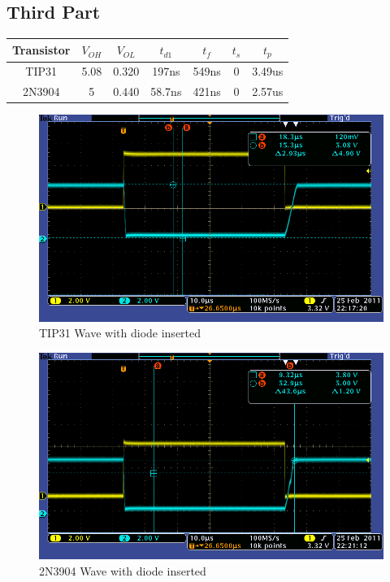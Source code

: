 \documentclass[10pt]{report}
\begin{document}
	\subsection{Third Part}
		\begin{center} \begin{tabular}{*{6}{c|}c}
			Transistor & $V_{OH}$ & $V_{OL}$ & $t_{d1}$ & $t_f$ & $t_s$ & $t_p$
			\\ \hline

			TIP31 & 5.08 & 0.320 & 197ns & 549ns & 0 & 3.49us \\

			2N3904 & 5 & 0.440 & 58.7ns & 421ns & 0 & 2.57us \\

		\end{tabular} \end{center}

		\begin{figure} \begin{center}
			\includegraphics[width=4.5in]{wave_3_tip31.png}
			\caption{TIP31 Wave with diode inserted}
		\end{center} \end{figure}

		\begin{figure} \begin{center}
			\includegraphics[width=4.5in]{wave_3_3904.png}
			\caption{2N3904 Wave with diode inserted}
		\end{center} \end{figure}
\end{document}
